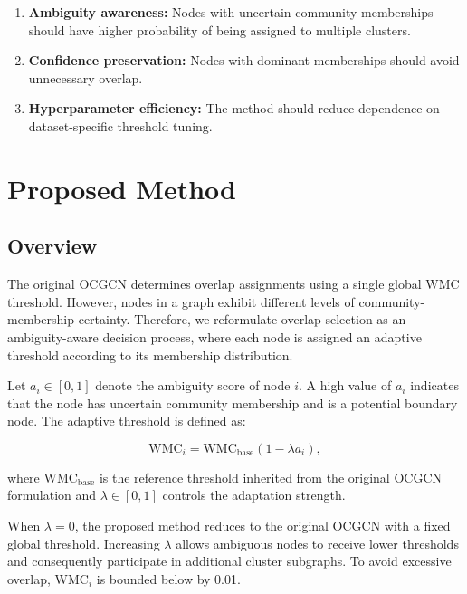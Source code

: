 \documentclass[a4paper,11pt,oneside,onecolumn,preprint]{elsarticle}
\numberwithin{equation}{section}
\begin{document}
\begin{enumerate}
    \item \textbf{Ambiguity awareness:}
    Nodes with uncertain community memberships should have higher probability of being assigned to multiple clusters.

    \item \textbf{Confidence preservation:}
    Nodes with dominant memberships should avoid unnecessary overlap.

    \item \textbf{Hyperparameter efficiency:}
    The method should reduce dependence on dataset-specific threshold tuning.
\end{enumerate}
\section{Proposed Method}
\label{sec:method}

\subsection{Overview}
\label{subsec:overview}

The original OCGCN determines overlap assignments using a single global WMC threshold.
However, nodes in a graph exhibit different levels of community-membership certainty.
Therefore, we reformulate overlap selection as an ambiguity-aware decision process, where each node is assigned an adaptive threshold according to its membership distribution.

Let $a_i \in [0,1]$ denote the ambiguity score of node $i$.
A high value of $a_i$ indicates that the node has uncertain community membership and is a potential boundary node.
The adaptive threshold is defined as:

\begin{equation}
  \mathrm{WMC}_i =
  \mathrm{WMC}_{\mathrm{base}}
  \left(1-\lambda a_i\right),
  \label{eq:adaptive}
\end{equation}

where $\mathrm{WMC}_{\mathrm{base}}$ is the reference threshold inherited from the original OCGCN formulation and $\lambda\in[0,1]$ controls the adaptation strength.

When $\lambda=0$, the proposed method reduces to the original OCGCN with a fixed global threshold.
Increasing $\lambda$ allows ambiguous nodes to receive lower thresholds and consequently participate in additional cluster subgraphs.
To avoid excessive overlap, $\mathrm{WMC}_i$ is bounded below by 0.01.
\end{document}
